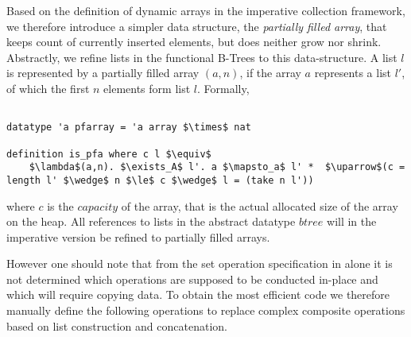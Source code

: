 Based on the definition of dynamic arrays in the 
imperative collection framework,
we therefore introduce a simpler data structure,
the \textit{partially filled array},
that keeps count of currently inserted elements,
but does neither grow nor shrink.
Abstractly, we refine lists in the functional B-Trees to this
data-structure.
A list $l$ is represented by a partially filled array $(a,n)$,
if the array $a$ represents a list $l'$, of which the first $n$
elements form list $l$.
Formally,

\begin{lstlisting}[mathescape=true, language=Isabelle]

datatype 'a pfarray = 'a array $\times$ nat

definition is_pfa where c l $\equiv$
    $\lambda$(a,n). $\exists_A$ l'. a $\mapsto_a$ l' *  $\uparrow$(c = length l' $\wedge$ n $\le$ c $\wedge$ l = (take n l'))
\end{lstlisting}

where $c$ is the $capacity$ of the array, that is the actual allocated size
of the array on the heap.
All references to lists in the abstract datatype $btree$
will in the imperative version be refined to partially filled arrays.

However one should note that
from the set operation specification in  alone
it is not determined which operations are supposed to be conducted
in-place and which will require copying data.
To obtain the most efficient code we therefore manually
define the following operations to replace complex composite
operations based on list construction and concatenation.

